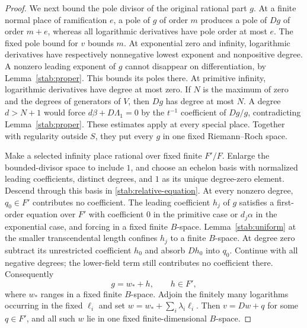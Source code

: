 \documentclass[11pt,a4paper]{article}
\theoremstyle{definition}
\theoremstyle{remark}
\numberwithin{equation}{section}
\begin{document}
\begin{proof}
We next bound the pole divisor of the original rational part $g$.
At a finite normal place of ramification $e$, a pole of $g$ of order
$m$ produces a pole of $Dg$ of order $m+e$, whereas all logarithmic
derivatives have pole order at most $e$.  The fixed pole bound for
$v$ bounds $m$.  At exponential zero and infinity, logarithmic
derivatives have respectively nonnegative lowest exponent and
nonpositive degree.  A nonzero leading exponent of $g$ cannot
disappear on differentiation, by Lemma~\ref{stab:proper}.  This bounds
its poles there.  At primitive infinity, logarithmic derivatives
have degree at most zero.  If $N$ is the maximum of zero and the
degrees of generators of $V$, then $Dg$ has degree at most $N$.
A degree $d>N+1$ would force $d\beta+D\Lambda_1=0$ by the
$t^{-1}$ coefficient of $Dg/g$, contradicting
Lemma~\ref{stab:proper}.  These estimates apply at every special
place.  Together with regularity outside $S$, they put every $g$ in
one fixed Riemann--Roch space.

Make a selected infinity place rational over fixed finite $F'/F$.
Enlarge the bounded-divisor space to include $1$, and choose an
echelon basis with normalized leading coefficients, distinct degrees,
and $1$ as its unique degree-zero element.  Descend through this
basis in \eqref{stab:relative-equation}.  At every nonzero degree,
$q_0\in F'$ contributes no coefficient.  The leading coefficient
$h_j$ of $g$ satisfies a first-order equation over $F'$ with coefficient
$0$ in the primitive case or $d_j\alpha$ in the exponential case,
and forcing in a fixed finite $B$-space.  Lemma~\ref{stab:uniform}
at the smaller transcendental length confines $h_j$ to a finite
$B$-space.  At degree zero subtract its unrestricted coefficient
$h_0$ and absorb $Dh_0$ into $q_0$.  Continue with all negative
degrees; the lower-field term still contributes no coefficient there.
Consequently
\[
 g=w_*+h,\qquad h\in F',
\]
where $w_*$ ranges in a fixed finite $B$-space.  Adjoin the finitely
many logarithms occurring in the fixed $\ell_i$ and set
$w=w_*+\sum_i\lambda_i\ell_i$.  Then $v=Dw+q$ for some $q\in F'$,
and all such $w$ lie in one fixed finite-dimensional $B$-space.
\end{proof}
\end{document}
